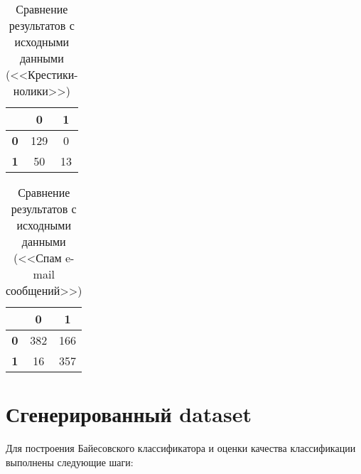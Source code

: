 \documentclass[]{article}
\numberwithin{equation}{section}
\begin{document}


        \begin{table}[H]
            \centering
            \begin{tabular}{|c|c|c|}
              \hline
                & \textbf{0} & \textbf{1} \\
              \hline
              \textbf{0} & 129 & 0\\
              \hline
              \textbf{1} & 50 &  13\\
              \hline
            \end{tabular}
            \caption{Сравнение результатов с исходными данными (<<Крестики-нолики>>)}
        \end{table}

        \begin{table}[H]
            \centering
            \begin{tabular}{|c|c|c|}
              \hline
                & \textbf{0} & \textbf{1} \\
              \hline
              \textbf{0} & 382 & 166\\
              \hline
              \textbf{1} & 16 & 357 \\
              \hline
            \end{tabular}
            \caption{Сравнение результатов с исходными данными (<<Спам e-mail сообщений>>)}
        \end{table}

    \section{Сгенерированный dataset}
        Для построения Байесовского классификатора и оценки качества классификации выполнены следующие шаги:
\end{document}
